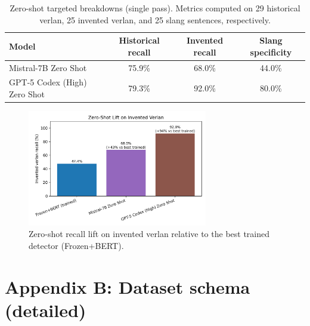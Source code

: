 \documentclass[12pt]{article}
\begin{document}
\begin{table}[H]
    \centering
    \footnotesize
    \begin{tabular}{lccc}
        \hline
        Model & Historical recall & Invented recall & Slang specificity \\
        \hline
        Mistral-7B Zero Shot & 75.9\% & 68.0\% & 44.0\% \\
        GPT-5 Codex (High) Zero Shot & 79.3\% & 92.0\% & 80.0\% \\
        \hline
    \end{tabular}
    \caption{Zero-shot targeted breakdowns (single pass). Metrics computed on 29 historical verlan, 25 invented verlan, and 25 slang sentences, respectively.}
    \label{tab:appendix-zeroshot-targeted}
\end{table}

\begin{figure}[H]
    \centering
    \includegraphics[width=0.7\textwidth]{figures/invented_relative_improvement.png}
    \caption{Zero-shot recall lift on invented verlan relative to the best trained detector (Frozen+BERT).}
    \label{fig:invented-lift}
\end{figure}

\section{Appendix B: Dataset schema (detailed)}
\end{document}
